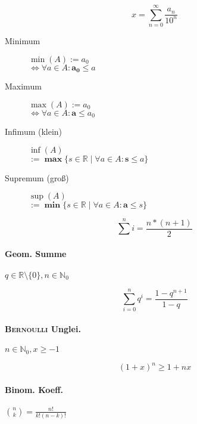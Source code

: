 \documentclass[uniLeipzig]{merkzettel}
\begin{document}
\begin{mzImportant}
  $$x = \sum_{n = 0}^\infty \frac{a_n}{10^n}$$
\end{mzImportant}

\begin{mzImportant}
  \begin{description}
    \item [Minimum]
          $\min(A) := a_0$ \\
          $\Leftrightarrow \forall a \in A: \mathbf{a_0} \boldsymbol{\leq} a$

    \item [Maximum]
          $\max(A) := a_0$ \\
          $\Leftrightarrow \forall a \in A: \mathbf{a} \boldsymbol{\leq} a_0$
  \end{description}
\end{mzImportant}

\begin{mzImportant}
  \begin{description}
    \item [Infimum (klein)] $\inf(A)$ \\
          $:= \mathbf{\max} \{ s \in \mathbb{R} \mid \forall a \in A: \mathbf{s} \boldsymbol{\leq} a \}$

    \item [Supremum (gro\ss)] $\sup(A)$ \\
          $:= \mathbf{\min} \{ s \in \mathbb{R} \mid \forall a \in A: \mathbf{a} \boldsymbol{\leq} s \}$
  \end{description}
\end{mzImportant}

\begin{mzImportant}
  $$\sum^n i = \frac{n * (n + 1)}{2}$$
\end{mzImportant}

\begin{mzImportant}

  \paragraph{Geom. Summe} $q \in \mathbb{R} \setminus \{ 0 \}, n \in \mathbb{N}_0$

  $$\sum_{i=0}^n q^i = \frac{1 - q^{n+1}}{1 - q}$$

  \paragraph{\textsc{Bernoulli} Unglei.} $n \in \mathbb{N}_0, x \geq -1$

  $$(1 + x)^n \geq 1 + nx$$

  \paragraph{Binom. Koeff.} $\binom{n}{k} = \frac{n!}{k! (n - k)!}$
\end{mzImportant}
\end{document}
